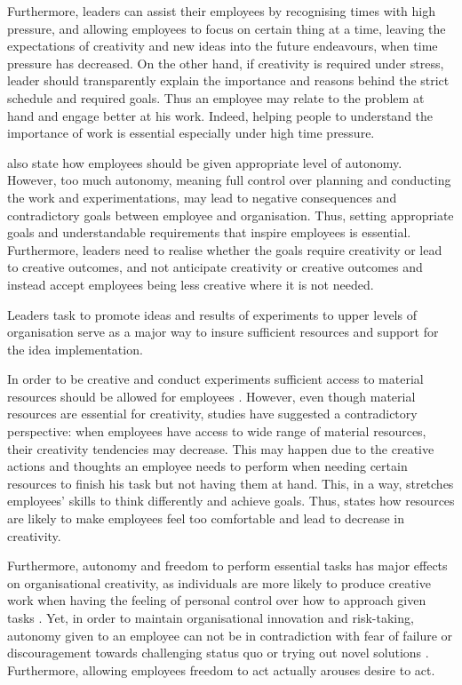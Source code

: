 Furthermore, leaders can assist their employees by recognising times with high pressure, and allowing employees to focus on certain thing at a time, leaving the expectations of creativity and new ideas into the future endeavours, when time pressure has decreased. On the other hand, if creativity is required under stress, leader should transparently explain the importance and reasons behind the strict schedule and required goals. Thus an employee may relate to the problem at hand and engage better at his work. Indeed, helping people to understand the importance of work is essential especially under high time pressure. \citep{amabile2002creativity}

\citet{shalley2004leaders} also state how employees should be given appropriate level of autonomy. However, too much autonomy, meaning full control over planning and conducting the work and experimentations, may lead to negative consequences and contradictory goals between employee and organisation. Thus, setting appropriate goals and understandable requirements that inspire employees is essential. Furthermore, leaders need to realise whether the goals require creativity or lead to creative outcomes, and not anticipate creativity or creative outcomes and instead accept employees being less creative where it is not needed. \citep{shalley2004leaders} 

Leaders task to promote ideas and results of experiments to upper levels of organisation serve as a major way to insure sufficient resources and support for the idea implementation. \citep{mumford2002leading} 

In order to be creative and conduct experiments sufficient access to material resources should be allowed for employees \citep{katz1985project}. However, even though material resources are essential for creativity, studies have suggested a contradictory perspective: when employees have access to wide range of material resources, their creativity tendencies may decrease. This may happen due to the creative actions and thoughts an employee needs to perform when needing certain resources to finish his task but not having them at hand. This, in a way, stretches employees' skills to think differently and achieve goals. \citep{csikszentmihalyi199916} Thus, \citet{csikszentmihalyi199916} states how resources are likely to make employees feel too comfortable and lead to decrease in creativity. 

Furthermore, autonomy and freedom to perform essential tasks has major effects on organisational creativity, as individuals are more likely to produce creative work when having the feeling of personal control over how to approach given tasks \citep{amabile1996assessing}. Yet, in order to maintain organisational innovation and risk-taking, autonomy given to an employee can not be in contradiction with fear of failure or discouragement towards challenging status quo or trying out novel solutions \citep{yukl2002leadership}. Furthermore, allowing employees freedom to act actually arouses desire to act.\citep{kanter1983change}

